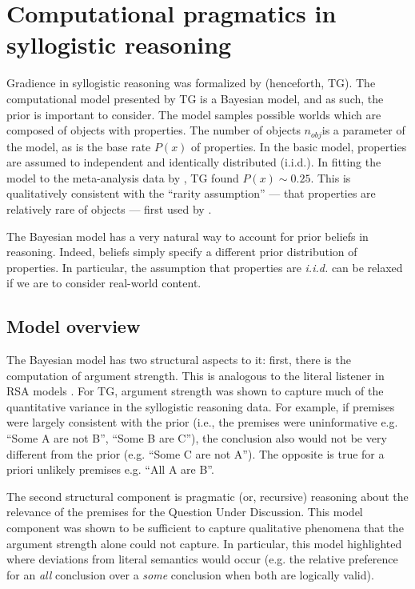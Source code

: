 \documentclass{article} %
\begin{document}
\section{Computational pragmatics in syllogistic reasoning}

Gradience in syllogistic reasoning was formalized by  (henceforth, TG). The computational model presented by TG is a Bayesian model, and as such, the prior is important to consider. The model samples possible worlds which are composed of objects with properties. The number of objects $n_{obj}$is a parameter of the model, as is the base rate $P(x)$ of properties. In the basic model, properties are assumed to independent and identically distributed (i.i.d.). In fitting the model to the meta-analysis data by , TG found $P(x) \sim 0.25$. This is qualitatively consistent with the ``rarity assumption'' --- that properties are relatively rare of objects --- first used by .

The Bayesian model has a very natural way to account for prior beliefs in reasoning. Indeed, beliefs simply specify a different prior distribution of properties. In particular, the assumption that properties are \emph{i.i.d.} can be relaxed if we are to consider real-world content.

\subsection{Model overview}

The Bayesian model has two structural aspects to it: first, there is the computation of argument strength. This is analogous to the literal listener in RSA models \cite{Frank2012,Goodman2013}. For TG,  argument strength was shown to capture much of the quantitative variance in the syllogistic reasoning data. For example, if premises were largely consistent with the prior (i.e., the premises were uninformative e.g. ``Some A are not B'', ``Some B are C''), the conclusion also would not be very different from the prior (e.g. ``Some C are not A''). The opposite is true for a priori unlikely premises e.g. ``All A are B''.  

The second structural component is pragmatic (or, recursive) reasoning about the relevance of the premises for the Question Under Discussion. This model component was shown to be sufficient to capture qualitative phenomena that the argument strength alone could not capture. In particular, this model highlighted where deviations from literal semantics would occur (e.g. the relative preference for an \emph{all} conclusion over a \emph{some} conclusion when both are logically valid). 
\end{document}
